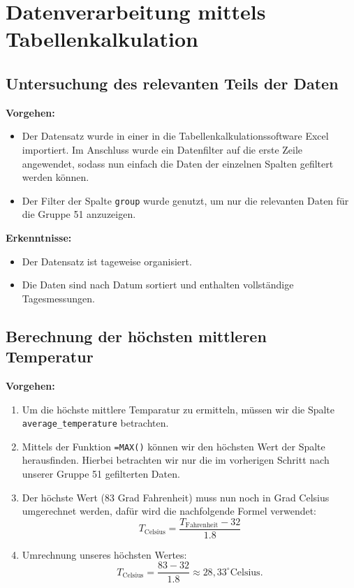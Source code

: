 \documentclass[a4paper,12pt]{article}
\begin{document}
\newpage

\section{Datenverarbeitung mittels Tabellenkalkulation}

\subsection{Untersuchung des relevanten Teils der Daten}
\textbf{Vorgehen:}
\begin{itemize}
    \item Der Datensatz wurde in einer in die Tabellenkalkulationssoftware Excel importiert. Im Anschluss wurde ein Datenfilter auf die erste Zeile angewendet, sodass nun einfach die Daten der einzelnen Spalten gefiltert werden können. 
    \item Der Filter der Spalte \texttt{group} wurde genutzt, um nur die relevanten Daten für die Gruppe 51 anzuzeigen.
\end{itemize}

\textbf{Erkenntnisse:}
\begin{itemize}
    \item Der Datensatz ist tageweise organisiert.
    \item Die Daten sind nach Datum sortiert und enthalten vollständige Tagesmessungen.
\end{itemize}

\subsection{Berechnung der höchsten mittleren Temperatur}
\textbf{Vorgehen:}
\begin{enumerate}
    \item Um die höchste mittlere Temparatur zu ermitteln, müssen wir die Spalte \texttt{average\_temperature} betrachten.
    \item Mittels der Funktion \texttt{=MAX()} können wir den höchsten Wert der Spalte herausfinden. Hierbei betrachten wir nur die im vorherigen Schritt nach unserer Gruppe 51 gefilterten Daten.
    \item Der höchste Wert (83 Grad Fahrenheit) muss nun noch in Grad Celsius umgerechnet werden, dafür wird die nachfolgende Formel verwendet:
    \[
    T_{\text{Celsius}} = \frac{T_{\text{Fahrenheit}} - 32}{1.8}
    \]
    \item Umrechnung unseres höchsten Wertes:
    \[
    T_{\text{Celsius}} = \frac{83 - 32}{1.8} \approx 28,33^\circ \text{Celsius}.
    \]
\end{enumerate}
\end{document}
